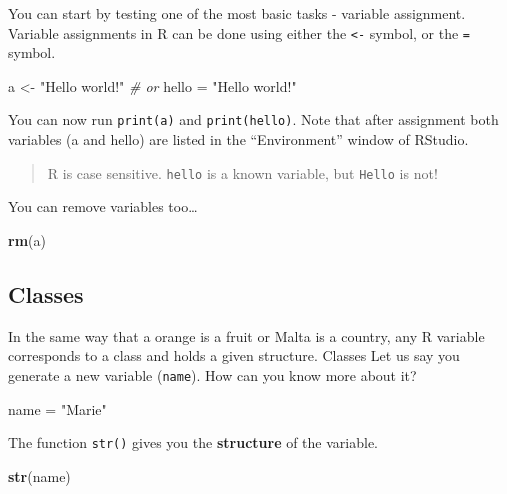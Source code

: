 \documentclass[
]{book}
\newenvironment{Shaded}{\begin{snugshade}}{\end{snugshade}}
\newcommand{\CommentTok}[1]{\textcolor[rgb]{0.56,0.35,0.01}{\textit{#1}}}
\newcommand{\FunctionTok}[1]{\textcolor[rgb]{0.13,0.29,0.53}{\textbf{#1}}}
\newcommand{\NormalTok}[1]{#1}
\newcommand{\OtherTok}[1]{\textcolor[rgb]{0.56,0.35,0.01}{#1}}
\newcommand{\StringTok}[1]{\textcolor[rgb]{0.31,0.60,0.02}{#1}}
\begin{document}
You can start by testing one of the most basic tasks - variable assignment.
Variable assignments in R can be done using either the \texttt{\textless{}-} symbol, or the \texttt{=} symbol.

\begin{Shaded}
\begin{Highlighting}[]
\NormalTok{a }\OtherTok{\textless{}{-}} \StringTok{"Hello world!"}
\CommentTok{\# or}
\NormalTok{hello }\OtherTok{=} \StringTok{"Hello world!"}
\end{Highlighting}
\end{Shaded}

You can now run \texttt{print(a)} and \texttt{print(hello)}.
Note that after assignment both variables (a and hello) are listed in the ``Environment'' window of RStudio.

\begin{quote}
R is case sensitive.
\texttt{hello} is a known variable, but \texttt{Hello} is not!
\end{quote}

You can remove variables too\ldots{}

\begin{Shaded}
\begin{Highlighting}[]
\FunctionTok{rm}\NormalTok{(a)}
\end{Highlighting}
\end{Shaded}

\hypertarget{classes}{%
\subsection*{Classes}\label{classes}}

In the same way that a orange is a fruit or Malta is a country, any R variable corresponds to a class and holds a given structure.
Classes Let us say you generate a new variable (\texttt{name}).
How can you know more about it?

\begin{Shaded}
\begin{Highlighting}[]
\NormalTok{name }\OtherTok{=} \StringTok{"Marie"}
\end{Highlighting}
\end{Shaded}

The function \texttt{str()} gives you the \textbf{structure} of the variable.

\begin{Shaded}
\begin{Highlighting}[]
\FunctionTok{str}\NormalTok{(name)}
\end{Highlighting}
\end{Shaded}
\end{document}
